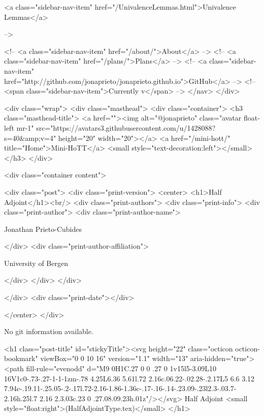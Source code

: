       
    
      
        
          <a class="sidebar-nav-item" href="/UnivalenceLemmas.html">Univalence Lemmas</a>
        
      
     -->

    <!-- <a class="sidebar-nav-item" href="/about/">About</a> -->
    <!-- <a class="sidebar-nav-item" href="/plans/">Plans</a> -->
    <!-- <a class="sidebar-nav-item" href="http://github.com/jonaprieto/jonaprieto.github.io">GitHub</a> -->
    <!-- <span class="sidebar-nav-item">Currently v</span> -->
  </nav>
</div>

    <div class="wrap">
      <div class="masthead">
        <div class="container">
          <h3 class="masthead-title">
            <a href=""><img alt="@jonaprieto" class="avatar float-left mr-1" src="https://avatars3.githubusercontent.com/u/1428088?s=40&amp;v=4" height="20" width="20"></a>
            <a href="/mini-hott/" title="Home">Mini-HoTT</a>
            <small style="text-decoration:left"></small>
          </h3>
        </div>
      
      <div class="container content">
        







<div class="post">
  <div class="print-version">
    <center>
      <h1>Half Adjoint</h1><br/>
        <div class="print-authors">
          <div class="print-info">
            <div class="print-author">
              <div class="print-author-name">
                
                  Jonathan Prieto-Cubides
                
              </div>
              <div class="print-author-affiliation">
                
                  University of Bergen
                
                </div>
            </div>
          </div>
          
          
        </div>
        <div class="print-date"></div>
        
        
    </center>
  </div>

  
  No git information available.
  

  <h1 class="post-title" id="stickyTitle"><svg height="22" class="octicon octicon-bookmark" viewBox="0 0 10 16" version="1.1" width="13" aria-hidden="true"><path fill-rule="evenodd" d="M9 0H1C.27 0 0 .27 0 1v15l5-3.09L10 16V1c0-.73-.27-1-1-1zm-.78 4.25L6.36 5.61l.72 2.16c.06.22-.02.28-.2.17L5 6.6 3.12 7.94c-.19.11-.25.05-.2-.17l.72-2.16-1.86-1.36c-.17-.16-.14-.23.09-.23l2.3-.03.7-2.16h.25l.7 2.16 2.3.03c.23 0 .27.08.09.23h.01z"/></svg> Half Adjoint <small style="float:right">(HalfAdjointType.tex)</small>
  </h1>

